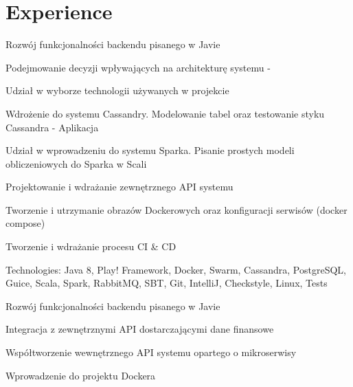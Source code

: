 \documentclass[]{deedy-resume-openfont}
\begin{document}
\begin{minipage}[t]{0.66\textwidth} 


\section{Experience}

\vspace{\topsep} %
\begin{tightemize}
\item Rozwój funkcjonalności backendu pisanego w Javie
\item Podejmowanie decyzji wpływających na architekturę systemu - 
\item Udział w wyborze technologii używanych w projekcie
\item Wdrożenie do systemu Cassandry. Modelowanie tabel oraz testowanie styku Cassandra - Aplikacja
\item Udział w wprowadzeniu do systemu Sparka. Pisanie prostych modeli obliczeniowych do Sparka w Scali
\item Projektowanie i wdrażanie zewnętrznego API systemu
\item Tworzenie i utrzymanie obrazów Dockerowych oraz konfiguracji serwisów (docker compose)
\item Tworzenie i wdrażanie procesu CI \& CD
\end{tightemize}
Technologies: Java 8, Play! Framework, Docker, Swarm, Cassandra, PostgreSQL, Guice, Scala, Spark, RabbitMQ, SBT, Git, IntelliJ, Checkstyle, Linux, Tests
\sectionsep

\begin{tightemize}
\item Rozwój funkcjonalności backendu pisanego w Javie
\item Integracja z zewnętrznymi API dostarczającymi dane finansowe
\item Współtworzenie wewnętrznego API systemu opartego o mikroserwisy
\item Wprowadzenie do projektu Dockera
\end{tightemize}
\sectionsep


\end{minipage}
\end{document}
